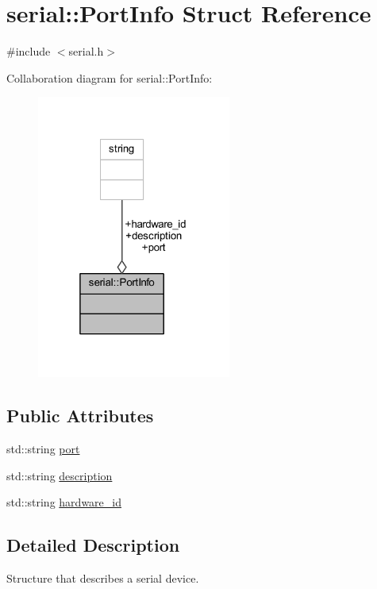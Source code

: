 \hypertarget{structserial_1_1_port_info}{}\section{serial\+:\+:Port\+Info Struct Reference}
\label{structserial_1_1_port_info}


{\ttfamily \#include $<$serial.\+h$>$}



Collaboration diagram for serial\+:\+:Port\+Info\+:\nopagebreak
\begin{figure}[H]
\begin{center}
\leavevmode
\includegraphics[width=181pt]{structserial_1_1_port_info__coll__graph}
\end{center}
\end{figure}
\subsection*{Public Attributes}
\begin{DoxyCompactItemize}
\item 
std\+::string \mbox{\hyperlink{structserial_1_1_port_info_a5d4242cdd6c0d01260e24964af4c23d2}{port}}
\item 
std\+::string \mbox{\hyperlink{structserial_1_1_port_info_a2ba37dd33d47b554aef5c15c1fe8b872}{description}}
\item 
std\+::string \mbox{\hyperlink{structserial_1_1_port_info_a7d55368e1a4e6ccc9da6f4d339524837}{hardware\+\_\+id}}
\end{DoxyCompactItemize}


\subsection{Detailed Description}
Structure that describes a serial device. 

